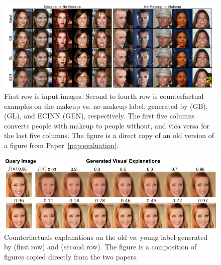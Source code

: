 \documentclass[11pt,a4paper,twoside,openright,final]{memoir}
\newcommand*{\paperref}[1]{Paper~\hyperref[#1]{\ref{#1}}}
\begin{document}
\begin{figure}
    \centering
    \includegraphics[trim={0, 10, 0, 0}, clip, width=\textwidth]{graphics/celeba.pdf} 
    \caption{First row is input images. Second to fourth row is counterfactual examples on the makeup vs. no makeup label, generated by \cite{Wachter2017} (GB), \cite{VanLooveren2019} (GL), and ECINN (GEN), respectively. The first five columns converts people with makeup to people without, and vica versa for the last five columns. The figure is a direct copy of an old version of a figure from \paperref{pap:evaluation}.}
    \label{fig:iterative-counterfactuals-copied}
\end{figure}
\begin{figure}[b]
    \centering
    \includegraphics[width=\linewidth]{graphics/generative.png}
    \caption{Counterfactuals explanations on the old vs. young label generated by \cite{Rodriguez2021} (first row) and \cite{Singla2019} (second row). The figure is a composition of figures copied directly from the two papers.} 
    \label{fig:generative-counterfactuals-copied}
\end{figure}
\end{document}
